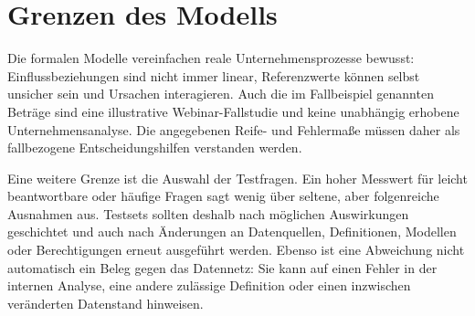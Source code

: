 \documentclass[a4paper,12pt,twoside]{report}
\theoremstyle{definition}
\begin{document}
\section{Grenzen des Modells}
Die formalen Modelle vereinfachen reale Unternehmens\-prozesse bewusst: Einfluss\-beziehungen sind nicht immer linear, Referenzwerte können selbst unsicher sein und Ursachen interagieren. Auch die im Fallbeispiel genannten Beträge sind eine illustrative Webinar-Fallstudie und keine unabhängig erhobene Unternehmensanalyse. Die angegebenen Reife- und Fehlermaße müssen daher als fallbezogene Entscheidungshilfen verstanden werden.

Eine weitere Grenze ist die Auswahl der Testfragen. Ein hoher Messwert für leicht beantwortbare oder häufige Fragen sagt wenig über seltene, aber folgenreiche Ausnahmen aus. Testsets sollten deshalb nach möglichen Auswirkungen geschichtet und auch nach Änderungen an Datenquellen, Definitionen, Modellen oder Berechtigungen erneut ausgeführt werden. Ebenso ist eine Abweichung nicht automatisch ein Beleg gegen das Datennetz: Sie kann auf einen Fehler in der internen Analyse, eine andere zulässige Definition oder einen inzwischen veränderten Datenstand hinweisen.
\end{document}
